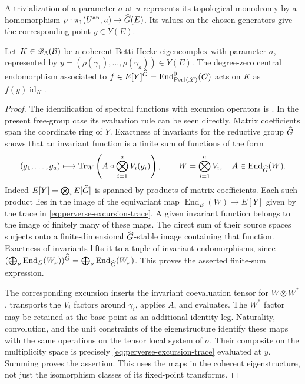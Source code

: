 A trivialization of a parameter $\sigma$ at $u$ represents its
topological monodromy by a homomorphism
$\rho:\pi_1(U^{\mathrm{an}},u)\to\widehat G(E)$.  Its values on the
chosen generators give the corresponding point $y\in Y(E)$.

\begin{lemma}\label{lem:perverse-scalar-center}
Let $K\in\mathscr D_\Lambda(\mathcal B)$ be a coherent Betti Hecke
eigencomplex with parameter $\sigma$, represented by
$y=(\rho(\gamma_1),\ldots,\rho(\gamma_a))\in Y(E)$.
The degree-zero central endomorphism associated to
$f\in E[Y]^{\widehat G}=\operatorname{End}^0_{\operatorname{Perf}(\mathscr L)}(\mathcal O)$
acts on $K$ as $f(y)\operatorname{id}_K$.
\end{lemma}

\begin{proof}
The identification of spectral functions with excursion operators is
\cite[\S7.1 and Proposition~7.2.3]{NY}.  In the present free-group
case its evaluation rule can be seen directly.  Matrix coefficients
span the coordinate ring of $Y$.  Exactness of invariants for the
reductive group $\widehat G$ shows that an invariant function is a finite sum
of functions of the form
\begin{equation}\label{eq:perverse-excursion-trace}
 (g_1,\ldots,g_a)\longmapsto
 \operatorname{Tr}_{W}
 \left(A\circ\bigotimes_{i=1}^a V_i(g_i)\right),
 \qquad
 W=\bigotimes_{i=1}^a V_i,\quad A\in\operatorname{End}_{\widehat G}(W).
\end{equation}
Indeed $E[Y]=\bigotimes_i E[\widehat G]$ is spanned by products of
matrix coefficients.  Each such product lies in the image of the
equivariant map $\operatorname{End}_E(W)\to E[Y]$ given by the
trace in \eqref{eq:perverse-excursion-trace}.  A given invariant
function belongs to the image of finitely many of these maps.
The direct sum of their source spaces surjects onto a
finite-dimensional $\widehat G$-stable image containing that function.
Exactness of invariants lifts it to a tuple of invariant
endomorphisms, since
$(\bigoplus_\nu\operatorname{End}_E(W_\nu))^{\widehat G}
=\bigoplus_\nu\operatorname{End}_{\widehat G}(W_\nu)$.
This proves the asserted finite-sum expression.

The corresponding excursion inserts the invariant coevaluation tensor
for $W\otimes W^*$, transports the $V_i$ factors around $\gamma_i$,
applies $A$, and evaluates.  The $W^*$ factor may be retained at the
base point as an additional identity leg.  Naturality, convolution,
and the unit constraints of the eigenstructure identify these maps
with the same operations on the tensor local system of $\sigma$.
Their composite on the multiplicity space is precisely
\eqref{eq:perverse-excursion-trace} evaluated at $y$.  Summing proves
the assertion.  This uses the maps in the coherent eigenstructure,
not just the isomorphism classes of its fixed-point transforms.
\end{proof}

